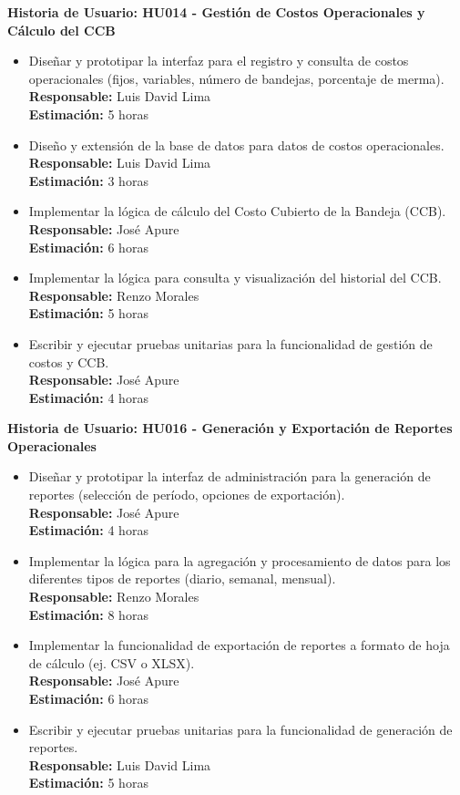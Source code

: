 \documentclass[12pt]{article}
\begin{document}
\pagebreak

\textbf{Historia de Usuario: HU014 - Gestión de Costos Operacionales y Cálculo del CCB}
\begin{itemize}
	\item Diseñar y prototipar la interfaz para el registro y consulta de costos operacionales (fijos, variables, número de bandejas, porcentaje de merma). \\
	\textbf{Responsable:} Luis David Lima \\
	\textbf{Estimación:} 5 horas
	\item Diseño y extensión de la base de datos para datos de costos operacionales. \\
	\textbf{Responsable:} Luis David Lima \\
	\textbf{Estimación:} 3 horas
	\item Implementar la lógica de cálculo del Costo Cubierto de la Bandeja (CCB). \\
	\textbf{Responsable:} José Apure \\
	\textbf{Estimación:} 6 horas
	\item Implementar la lógica para consulta y visualización del historial del CCB. \\
	\textbf{Responsable:} Renzo Morales \\
	\textbf{Estimación:} 5 horas
	\item Escribir y ejecutar pruebas unitarias para la funcionalidad de gestión de costos y CCB. \\
	\textbf{Responsable:} José Apure \\
	\textbf{Estimación:} 4 horas
\end{itemize}

\textbf{Historia de Usuario: HU016 - Generación y Exportación de Reportes Operacionales}
\begin{itemize}
	\item Diseñar y prototipar la interfaz de administración para la generación de reportes (selección de período, opciones de exportación). \\
	\textbf{Responsable:} José Apure \\
	\textbf{Estimación:} 4 horas
	\item Implementar la lógica para la agregación y procesamiento de datos para los diferentes tipos de reportes (diario, semanal, mensual). \\
	\textbf{Responsable:} Renzo Morales \\
	\textbf{Estimación:} 8 horas
	\item Implementar la funcionalidad de exportación de reportes a formato de hoja de cálculo (ej. CSV o XLSX). \\
	\textbf{Responsable:} José Apure \\
	\textbf{Estimación:} 6 horas
	\item Escribir y ejecutar pruebas unitarias para la funcionalidad de generación de reportes. \\
	\textbf{Responsable:} Luis David Lima \\
	\textbf{Estimación:} 5 horas
\end{itemize}
\end{document}
